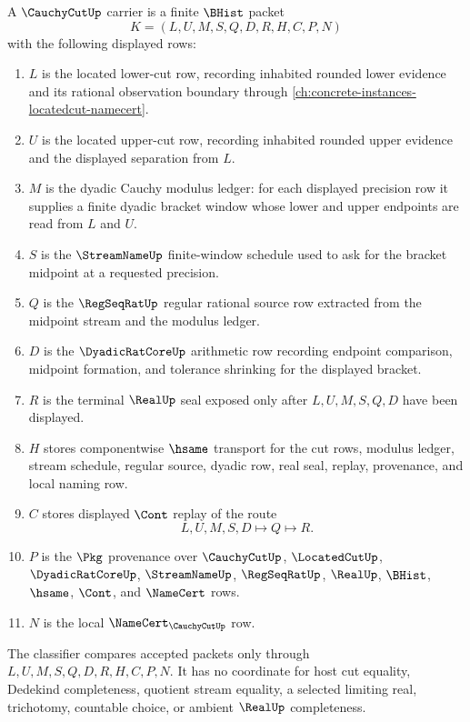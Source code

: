 \begin{definition}
\label{def:cauchy-cut-carrier}
A $\CauchyCutUp$ carrier is a finite $\BHist$ packet
$$
K=(L,U,M,S,Q,D,R,H,C,P,N)
$$
with the following displayed rows:
\begin{enumerate}
\item $L$ is the located lower-cut row, recording inhabited rounded lower evidence and its rational observation boundary through \autoref{ch:concrete-instances-locatedcut-namecert}.
\item $U$ is the located upper-cut row, recording inhabited rounded upper evidence and the displayed separation from $L$.
\item $M$ is the dyadic Cauchy modulus ledger: for each displayed precision row it supplies a finite dyadic bracket window whose lower and upper endpoints are read from $L$ and $U$.
\item $S$ is the $\StreamNameUp$ finite-window schedule used to ask for the bracket midpoint at a requested precision.
\item $Q$ is the $\RegSeqRatUp$ regular rational source row extracted from the midpoint stream and the modulus ledger.
\item $D$ is the $\DyadicRatCoreUp$ arithmetic row recording endpoint comparison, midpoint formation, and tolerance shrinking for the displayed bracket.
\item $R$ is the terminal $\RealUp$ seal exposed only after $L,U,M,S,Q,D$ have been displayed.
\item $H$ stores componentwise $\hsame$ transport for the cut rows, modulus ledger, stream schedule, regular source, dyadic row, real seal, replay, provenance, and local naming row.
\item $C$ stores displayed $\Cont$ replay of the route
$$
L,U,M,S,D \longmapsto Q \longmapsto R .
$$
\item $P$ is the $\Pkg$ provenance over $\CauchyCutUp$, $\LocatedCutUp$, $\DyadicRatCoreUp$, $\StreamNameUp$, $\RegSeqRatUp$, $\RealUp$, $\BHist$, $\hsame$, $\Cont$, and $\NameCert$ rows.
\item $N$ is the local $\NameCert_{\CauchyCutUp}$ row.
\end{enumerate}
The classifier compares accepted packets only through $L,U,M,S,Q,D,R,H,C,P,N$. It has no coordinate for host cut equality, Dedekind completeness, quotient stream equality, a selected limiting real, trichotomy, countable choice, or ambient $\RealUp$ completeness.
\end{definition}

